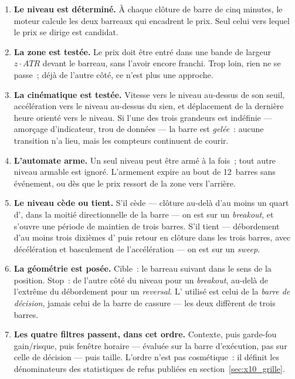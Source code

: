 \begin{enumerate}
  \item \textbf{Le niveau est déterminé.} À chaque clôture de barre de cinq
  minutes, le moteur calcule les deux barreaux qui encadrent le prix. Seul
  celui vers lequel le prix se dirige est candidat.

  \item \textbf{La zone est testée.} Le prix doit être entré dans une bande
  de largeur $z \cdot ATR$ devant le barreau, sans l'avoir encore franchi.
  Trop loin, rien ne se passe~; déjà de l'autre côté, ce n'est plus une
  approche.

  \item \textbf{La cinématique est testée.} Vitesse vers le niveau au-dessus
  de son seuil, accélération vers le niveau au-dessus du sien, et déplacement
  de la dernière heure orienté vers le niveau. Si l'une des trois grandeurs
  est indéfinie --- amorçage d'indicateur, trou de données --- la barre est
  \emph{gelée}~: aucune transition n'a lieu, mais les compteurs continuent de
  courir.

  \item \textbf{L'automate arme.} Un seul niveau peut être armé à la fois~;
  tout autre niveau armable est ignoré. L'armement expire au bout de
  12~barres sans événement, ou dès que le prix ressort de la zone vers
  l'arrière.

  \item \textbf{Le niveau cède ou tient.} S'il cède --- clôture au-delà d'au
  moins un quart d', dans la moitié directionnelle de la barre ---
  on est sur un \emph{breakout}, et s'ouvre une période de maintien de trois
  barres. S'il tient --- débordement d'au moins trois dixièmes d'
  puis retour en clôture dans les trois barres, avec décélération et
  basculement de l'accélération --- on est sur un \emph{sweep}.

  \item \textbf{La géométrie est posée.} Cible~: le barreau suivant dans le
  sens de la position. Stop~: de l'autre côté du niveau pour un
  \emph{breakout}, au-delà de l'extrême du débordement pour un
  \emph{reversal}. L' utilisé est celui de la \emph{barre de
  décision}, jamais celui de la barre de cassure --- les deux diffèrent de
  trois barres.

  \item \textbf{Les quatre filtres passent, dans cet ordre.} Contexte, puis
  garde-fou gain/risque, puis fenêtre horaire --- évaluée sur la barre
  d'exécution, pas sur celle de décision --- puis taille. L'ordre n'est pas
  cosmétique~: il définit les dénominateurs des statistiques de refus
  publiées en section~\ref{sec:x10_grille}.


\end{enumerate}

